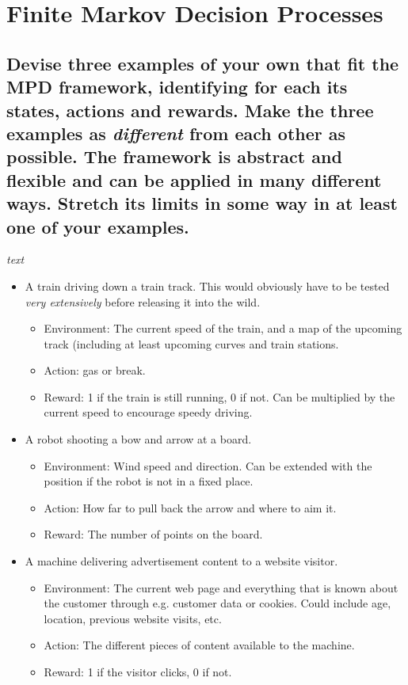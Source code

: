 \documentclass{article}
\begin{document}
\setcounter{section}{2}
\section{Finite Markov Decision Processes}

\subsection{Devise three examples of your own that fit the MPD framework, identifying for each its states, actions and rewards. Make the three examples as \textit{different} from each other as possible. The framework is abstract and flexible and can be applied in many different ways. Stretch its limits in some way in at least one of your examples.}
\textit{text}
\begin{itemize}
\item A train driving down a train track. This would obviously have to be tested \textit{very extensively} before releasing it into the wild.
	\begin{itemize}
	\item Environment: The current speed of the train, and a map of the upcoming track (including at least upcoming curves and train stations.
	\item Action: gas or break. 
	\item Reward: 1 if the train is still running, 0 if not. Can be multiplied by the current speed to encourage speedy driving.
	\end{itemize}
\item A robot shooting a bow and arrow at a board. 
	\begin{itemize}
	\item Environment: Wind speed and direction. Can be extended with the position if the robot is not in a fixed place.
	\item  Action: How far to pull back the arrow and where to aim it. 
	\item Reward: The number of points on the board.
	\end{itemize}
\item A machine delivering advertisement content to a website visitor. 
		\begin{itemize}
	\item Environment: The current web page and everything that is known about the customer through e.g. customer data or cookies. Could include age, location, previous website visits, etc.
	\item  Action: The different pieces of content available to the machine. 
	\item Reward: 1 if the visitor clicks, 0 if not.
	\end{itemize}
\end{itemize}
\end{document}
